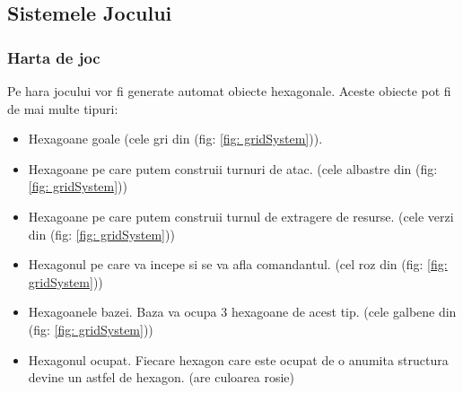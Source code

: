 \documentclass[12pt, a4paper]{article}
\begin{document}
	



	

	
	
	
	
	
	\subsection{Sistemele Jocului}
	
	
	
	
	
	\subsubsection{Harta de joc}
	
	Pe hara jocului vor fi generate automat obiecte hexagonale. Aceste obiecte pot fi de mai multe tipuri:
	\begin{itemize}
		\item Hexagoane goale (cele gri din (fig: \ref{fig: gridSystem})).
		\item Hexagoane pe care putem construii turnuri de atac. (cele albastre din (fig: \ref{fig: gridSystem}))
		\item Hexagoane pe care putem construii turnul de extragere de resurse. (cele verzi din (fig: \ref{fig: gridSystem}))
		\item Hexagonul pe care va incepe si se va afla comandantul. (cel roz din (fig: \ref{fig: gridSystem}))
		\item Hexagoanele bazei. Baza va ocupa 3 hexagoane de acest tip. (cele galbene din (fig: \ref{fig: gridSystem}))
		\item Hexagonul ocupat. Fiecare hexagon care este ocupat de o anumita structura devine un astfel de hexagon. (are culoarea rosie)
	\end{itemize}
\end{document}
